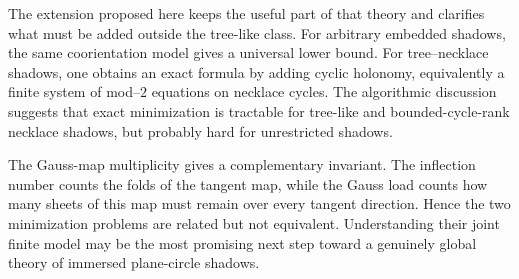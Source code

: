 \documentclass[11pt]{article}
\begin{document}
The extension proposed here keeps the useful part of that theory and clarifies what must be added outside the tree-like class.  For arbitrary embedded shadows, the same coorientation model gives a universal lower bound.  For tree--necklace shadows, one obtains an exact formula by adding cyclic holonomy, equivalently a finite system of mod--$2$ equations on necklace cycles.  The algorithmic discussion suggests that exact minimization is tractable for tree-like and bounded-cycle-rank necklace shadows, but probably hard for unrestricted shadows.

The Gauss-map multiplicity gives a complementary invariant.  The inflection number counts the folds of the tangent map, while the Gauss load counts how many sheets of this map must remain over every tangent direction.  Hence the two minimization problems are related but not equivalent.  Understanding their joint finite model may be the most promising next step toward a genuinely global theory of immersed plane-circle shadows.
\end{document}
